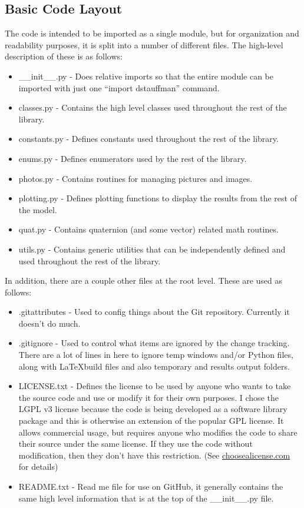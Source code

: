 \documentclass[12pt]{article}
\begin{document}
\subsection{Basic Code Layout}\label{Basic_code_layout}
The code is intended to be imported as a single module, but for organization and readability purposes, it is split into a number of different files.  The high-level description of these is as follows:
\begin{itemize}
    \setlength{\itemsep}{0pt}
    \setlength{\parskip}{0pt}
    \setlength{\parsep}{0pt}
    \item \_\_init\_\_.py - Does relative imports so that the entire module can be imported with just one ``import dstauffman'' command.
    \item classes.py - Contains the high level classes used throughout the rest of the library.
    \item constants.py - Defines constants used throughout the rest of the library.
    \item enums.py - Defines enumerators used by the rest of the library.
    \item photos.py - Contains routines for managing pictures and images.
    \item plotting.py - Defines plotting functions to display the results from the rest of the model.
    \item quat.py - Contains quaternion (and some vector) related math routines.
    \item utils.py - Contains generic utilities that can be independently defined and used throughout the rest of the library.
\end{itemize}

In addition, there are a couple other files at the root level.  These are used as follows:
\begin{itemize}
    \setlength{\itemsep}{0pt}
    \setlength{\parskip}{0pt}
    \setlength{\parsep}{0pt}
    \item .gitattributes - Used to config things about the Git repository.  Currently it doesn't do much.
    \item .gitignore - Used to control what items are ignored by the change tracking.  There are a lot of lines in here to ignore temp windows and/or Python files, along with \LaTeX build files and also temporary and results output folders.
    \item LICENSE.txt - Defines the license to be used by anyone who wants to take the source code and use or modify it for their own purposes.  I chose the LGPL v3 license because the code is being developed as a software library package and this is otherwise an extension of the popular GPL license.  It allows commercial usage, but requires anyone who modifies the code to share their source under the same license.  If they use the code without modification, then they don't have this restriction.  (See \href{http://choosealicense.com/}{choosealicense.com} for details)
    \item README.txt - Read me file for use on GitHub, it generally contains the same high level information that is at the top of the \_\_init\_\_.py file.
\end{itemize}
\end{document}
